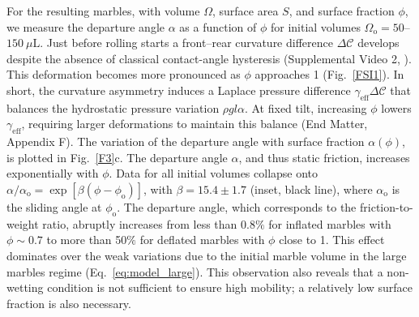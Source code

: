 \documentclass[twocolumn, prl,
 amsmath,amssymb,
 superscriptaddress,aps,
]{revtex4-2}
\begin{document}
For the resulting marbles, with volume $\Omega$, surface area $S$, and surface fraction $\phi$, we measure the departure angle $\alpha$ as a function of $\phi$ for initial volumes $\Omega_\mathrm{o}=50$--$150~\mu\mathrm{L}$.
Just before rolling starts a front--rear curvature difference $\Delta\mathcal{C}$ develops despite the absence of classical contact-angle hysteresis (Supplemental Video 2, \cite{Supplemental}). This deformation becomes more pronounced as $\phi$ approaches 1 (Fig.~\ref{FSI1}). 
In short, the curvature asymmetry induces a Laplace pressure difference $\gamma_\mathrm{eff}\Delta\mathcal{C}$ that balances the hydrostatic pressure variation $\rho g l\alpha$. At fixed tilt, increasing $\phi$ lowers $\gamma_\mathrm{eff}$, requiring larger deformations to maintain this balance (End Matter, Appendix F).
The variation of the departure angle with surface fraction $\alpha(\phi)$, is plotted in Fig.~\ref{F3}c. 
The departure angle $\alpha$, and thus static friction, increases exponentially with $\phi$. Data for all initial volumes collapse onto $\alpha / \alpha_\mathrm{o} = \exp[\beta(\phi - \phi_\mathrm{o})]$, with $\beta = 15.4 \pm 1.7$ (inset, black line), where $\alpha_\mathrm{o}$ is the sliding angle at $\phi_\mathrm{o}$.
The departure angle, which corresponds to the friction-to-weight ratio, abruptly increases from less than 0.8$\%$ for inflated marbles with $\phi \sim 0.7$ to more than 50$\%$ for deflated marbles with $\phi$ close to 1.
This effect dominates over the weak variations due to the initial marble volume in the large marbles regime (Eq.~\ref{eq:model_large}). This observation also reveals that a non-wetting condition is not sufficient to ensure high mobility; a relatively low surface fraction is also necessary.
\end{document}
